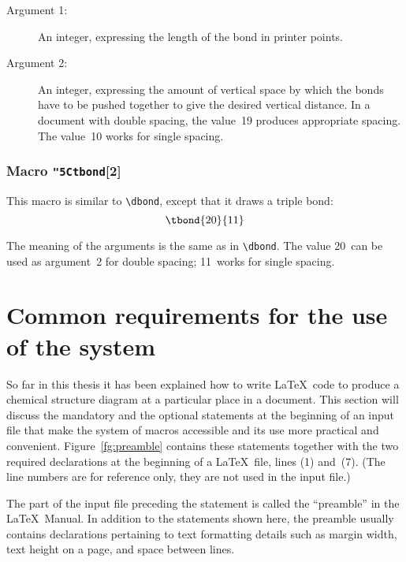  \begin{description}
 \item[{\rm Argument 1:}] An integer, expressing
      the length of the bond in printer points.
 \item[{\rm Argument 2:}] An integer, expressing
      the amount of vertical space by which the bonds have
      to be pushed together to give the desired vertical
      distance. In a document with double spacing, the
      value~19 produces appropriate spacing. The value~10 works for
      single spacing.
 \end{description}
 
\subsubsection{Macro {\tt\char"5C{}tbond}[2]}
  This macro is similar to \verb+\dbond+, except that it
 draws a triple bond:
 \[ \tbond{20}{11}  \]
 
 The meaning of the arguments is the same as in
 \verb+\dbond+. The value 20~can be used as argument~2 for double
 spacing; 11~works for single spacing.
 
\section{Common requirements for the use of the system}
 So far in this thesis it has been explained how to write
 \LaTeX\  code to produce a chemical structure diagram at a
 particular place in a document. This section will discuss the
 mandatory and the optional statements at the beginning of an
 input file that make the system of macros accessible and
 its use more practical and convenient. Figure~\ref{fg:preamble}
 contains
 these statements together with the two required declarations
 at the beginning of a \LaTeX\  file, lines (1) and~(7).
 (The line numbers are for reference only, they are not used
 in the input file.)
 
 The part of the input file preceding the \verb++
 statement is called the ``preamble'' in the \LaTeX\  Manual.
 In addition to the statements shown here, the preamble usually
 contains declarations pertaining to text formatting details
 such as margin width, text height on a page, and space between
 lines.
 
